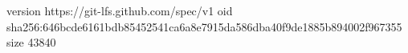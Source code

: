 version https://git-lfs.github.com/spec/v1
oid sha256:646bcde6161bdb85452541ca6a8e7915da586dba40f9de1885b894002f967355
size 43840

